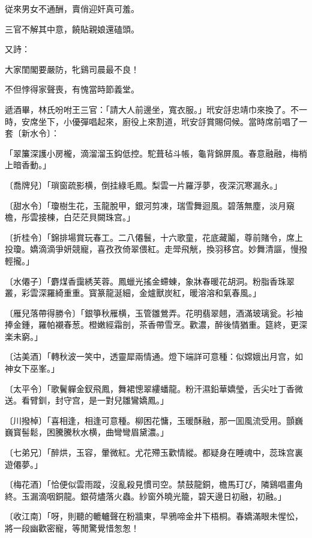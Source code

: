 \begin{myquote}
従來男女不通酬，賣俏迎奸真可羞。

三官不解其中意，饒貼親娘還磕頭。
\end{myquote}

又詩：

\begin{myquote}
大家閨閣要嚴防，牝鷄司晨最不良！

不但悖得家聲喪，有愧當時節義堂。
\end{myquote}

遞酒畢，林氏吩咐王三官：「請大人前邊坐，寬衣服。」玳安㧱忠靖巾來換了。不一時，安席坐下，小優彈唱起來，廚役上來割道，玳安㧱賞賜伺候。當時席前唱了一套〔新水令〕：

\begin{myquote}
「翠簾深護小房櫳，滴溜溜玉鈎低控。駝葺毡斗帳，龜背錦屏風。春意融融，梅梢上暗香動。」

{\markfont〔喬牌兒〕}「瑣窗疏影横，倒挂綠毛鳳。梨雲一片羅浮夢，夜深沉寒漏永。」

{\markfont〔甜水令〕}「瓊樹生花，玉龍脫甲，銀河剪凍，瑞雪舞迴風。碧落無塵，淡月窺檐，彤雲接棟，白茫茫貝闕珠宫。」

{\markfont〔折桂令〕}「錦排場賞玩春工。二八僊鬟，十六歌童，花底藏鬮，尊前賭令，席上投瓊。嬌滴滴爭妍競寵，喜孜孜倚翠偎紅。走斝飛觥，換羽移宫。妙舞清謳，慢撥輕攏。」

{\markfont〔水僊子〕}「麝煤香靄綉芙蓉。鳳蠟光搖金螮蝀，象牀春暖花胡洞。粉脂香珠翠叢，彩雲深羅綺重重。寳篆龍涎細，金爐獸炭紅，暖溶溶和氣春風。」

{\markfont〔雁兒落帶得勝令〕}「銀箏秋雁横，玉管雛鶯弄。花明翡翠翹，酒滿玻璃瓮。衫袖捧金鍾，羅帕襯春葱。橙嫩經霜剖，茶香帶雪烹。歡濃，醉後情猶重。筵終，更深楽未窮。」

{\markfont〔沽美酒〕}「轉秋波一笑中，透靈犀兩情通。燈下端詳可意種：似嫦娥出月宫，如神女下巫峯。」

{\markfont〔太平令〕}「歌鬢軃金釵飛鳳，舞裙憁翠縷蟠龍。粉汗濕鉛華嬌瑩，舌尖吐丁香微送。看臂釧，封守宫，是一對兒雛鸞嬌鳳。」

{\markfont〔川撥棹〕}「喜相逢，相逢可意種。柳困花慵，玉暖酥融，那一囬風流受用。顫巍巍寳髻鬆，困騰騰秋水横，曲彎彎眉黛濃。」

{\markfont〔七弟兄〕}「醉烘，玉容，暈微紅。尤花殢玉歡情縱。都疑身在睡魂中，蕊珠宫裏遊僊夢。」

{\markfont〔梅花酒〕}「恰便似雲雨蹤，沒亂殺見慣司空。禁鼓龍銅，檐馬玎び，隣鷄唱畫角終。玉漏滴咽銅龍。銀荷燼落火蟲。紗窗外曉光籠，碧天邊日初融，初融。」

{\markfont〔收江南〕}「呀，則聽的轆轤聲在粉牆東，早鴉啼金井下梧桐。春嬌滿眼未惺忪，將一段幽歡密寵，等閒驚覺惜怱怱！
\end{myquote}

